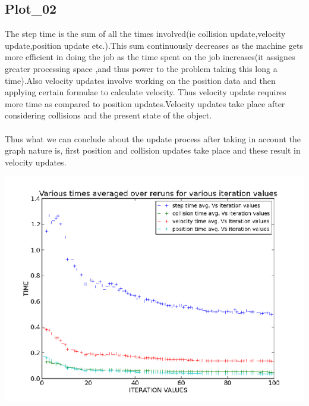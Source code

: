 \documentclass[11pt]{article}
\begin{document}
  \subsection{Plot\_02}
The step time is the sum of all the times involved(ie collision update,velocity update,position update etc.).This sum continuously decreases as the machine gets more efficient in doing the job as the time spent on the job increases(it assignes greater processing space ,and thus power to the problem taking this long a time).Also velocity updates involve working on the position data and then applying certain formulae to calculate velocity. Thus velocity update requires more time as compared to position updates.Velocity updates take place after considering collisions and the present state of the object.\\\\
Thus what we can conclude about the update process after taking in account the graph nature is, first position and collision updates take place and these result in velocity updates.
 \begin{center}
\includegraphics[scale=0.55]
{images/g18_plot02.png}
\end{center}

	
\end{document}
